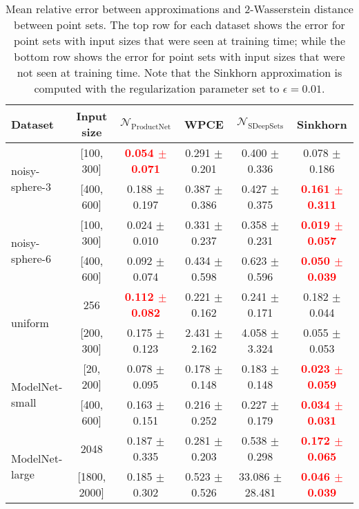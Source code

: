 \documentclass[12pt]{article}
\newcommand{\Network}{\mathcal{N}_{\mathrm{ProductNet}}}
\begin{document}
\begin{table}[t]
    \centering
    \caption{Mean relative error between approximations and 2-Wasserstein distance between point sets. The top row for each dataset shows the error for point sets with input sizes that were seen at training time; while the bottom row shows the error for point sets with input sizes that were not seen at training time. Note that the Sinkhorn approximation is computed with the regularization parameter set to $\epsilon = 0.01$.}
    
    \begin{tabular}{lccccc}
          \hline
          Dataset & Input size & $\Network$ & WPCE & $\mathcal{N}_{\mathrm{SDeepSets}}$ & Sinkhorn  \\
          \hline
          \multirow{2}{*}{ noisy-sphere-3} & [100, 300] & \textcolor{red}{\textbf{0.054 $\pm$ 0.071}} & 0.291 $\pm$ 0.201 & 0.400 $\pm$ 0.336 & 0.078 $\pm$ 0.186\\
          & [400, 600] & 0.188 $\pm$ 0.197 & 0.387 $\pm$ 0.386 & 0.427 $\pm$ 0.375 & \textbf{\textcolor{red}{0.161 $\pm$ 0.311}}\\
         \hline
         \multirow{2}{*}{ noisy-sphere-6} & [100, 300] & 0.024 $\pm$ 0.010 & 0.331 $\pm$ 0.237 & 0.358 $\pm$ 0.231 & \textbf{\textcolor{red}{0.019 $\pm$ 0.057}}\\
         & [400, 600] & 0.092 $\pm$ 0.074 & 0.434 $\pm$ 0.598 & 0.623 $\pm$ 0.596 & \textbf{\textcolor{red}{0.050 $\pm$ 0.039}}\\
         \hline
         \multirow{2}{*}{uniform} & 256 &  \textbf{\textcolor{red}{0.112 $\pm$ 0.082}} & 0.221 $\pm$ 0.162  & 0.241 $\pm$ 0.171 &0.182 $\pm$ 0.044\\
         & [200, 300] & 0.175 $\pm$ 0.123 & 2.431 $\pm$ 2.162 & 4.058 $\pm$ 3.324 & 0.055 $\pm$ 0.053 \\
         \hline
         \multirow{2}{*}{ModelNet-small} & [20, 200] & 0.078 $\pm$ 0.095 & 0.178 $\pm$ 0.148 & 0.183 $\pm$ 0.148 & \textbf{\textcolor{red}{0.023 $\pm$ 0.059}}\\
         & [400, 600] & 0.163 $\pm$ 0.151 & 0.216 $\pm$ 0.252 & 0.227 $\pm$ 0.179 & \textbf{\textcolor{red}{0.034 $\pm$ 0.031}} \\
         \hline
         \multirow{2}{*}{ModelNet-large} & 2048 & 0.187 $\pm$ 0.335 & 0.281 $\pm$ 0.203 & 0.538 $\pm$ 0.298 & \textcolor{red}{\textbf{0.172 $\pm$ 0.065}} \\
         & [1800, 2000] & 0.185 $\pm$ 0.302 & 0.523 $\pm$ 0.526 & 33.086 $\pm$ 28.481 & \textcolor{red}{\textbf{0.046 $\pm$ 0.039}}\\

\end{tabular}
\end{table}
\end{document}
